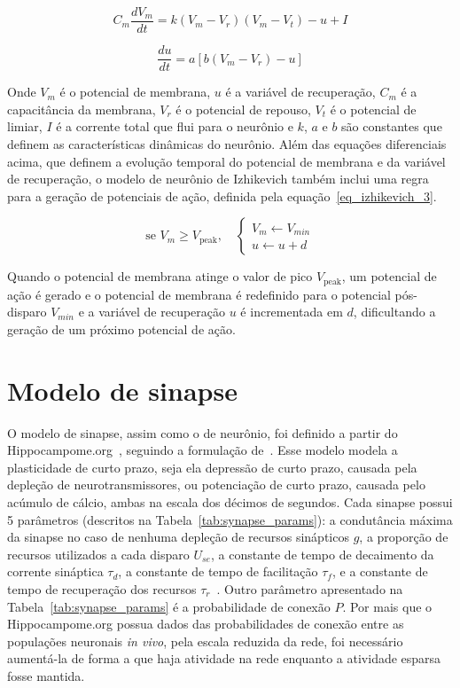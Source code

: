 \begin{equation}
\label{eq_izhikevich_1}
C_m \frac{dV_m}{dt} = k (V_m - V_r)(V_m - V_t) - u + I
\end{equation}

\begin{equation}
\label{eq_izhikevich_2}
\frac{du}{dt} = a [b(V_m-V_r) - u]
\end{equation}

Onde $V_m$ é o potencial de membrana, $u$ é a variável de recuperação, $C_m$ é a capacitância da membrana, $V_r$ é o
potencial de repouso, $V_t$ é o potencial de limiar, $I$ é a corrente total que flui para o neurônio e $k$, $a$ e $b$ são
constantes que definem as características dinâmicas do neurônio. Além das equações diferenciais acima, que definem a evolução
temporal do potencial de membrana e da variável de recuperação, o modelo de neurônio de Izhikevich também inclui uma regra para
a geração de potenciais de ação, definida pela equação~\ref{eq_izhikevich_3}.

\begin{equation}
\label{eq_izhikevich_3}
\text{se } V_m \geq V_{\text{peak}}, \quad
\begin{cases}
V_m \gets V_{min} \\
u \gets u + d
\end{cases}
\end{equation}

Quando o potencial de membrana atinge o valor de pico $V_{\text{peak}}$, um potencial de ação é gerado e o potencial de membrana é
redefinido para o potencial pós-disparo $V_{min}$ e a variável de recuperação $u$ é incrementada em $d$, dificultando a geração de
um próximo potencial de ação.



\section{Modelo de sinapse}

O modelo de sinapse, assim como o de neurônio, foi definido a partir do Hippocampome.org~\cite{wheelerHippocampomeorg2023},
seguindo a formulação de~. Esse modelo modela a plasticidade de curto prazo,
seja ela depressão de curto prazo, causada pela depleção de neurotransmissores, ou potenciação de curto prazo, causada pelo
acúmulo de cálcio, ambas na escala dos décimos de segundos. Cada sinapse possui 5 parâmetros (descritos na
Tabela~\ref{tab:synapse_params}): a condutância máxima da sinapse no caso de nenhuma depleção de recursos sinápticos $g$, a
proporção de recursos utilizados a cada disparo $U_{se}$, a constante de tempo de decaimento da corrente sináptica $\tau_d$, a
constante de tempo de facilitação $\tau_f$, e a constante de tempo de recuperação dos recursos
$\tau_r$~\cite{moradiNormalized2022}. Outro parâmetro apresentado na Tabela~\ref{tab:synapse_params} é a probabilidade de conexão
$P$. Por mais que o Hippocampome.org possua dados das probabilidades de conexão entre as populações neuronais \textit{in vivo},
pela escala reduzida da rede, foi necessário aumentá-la de forma a que haja atividade na rede enquanto a atividade esparsa fosse
mantida.


